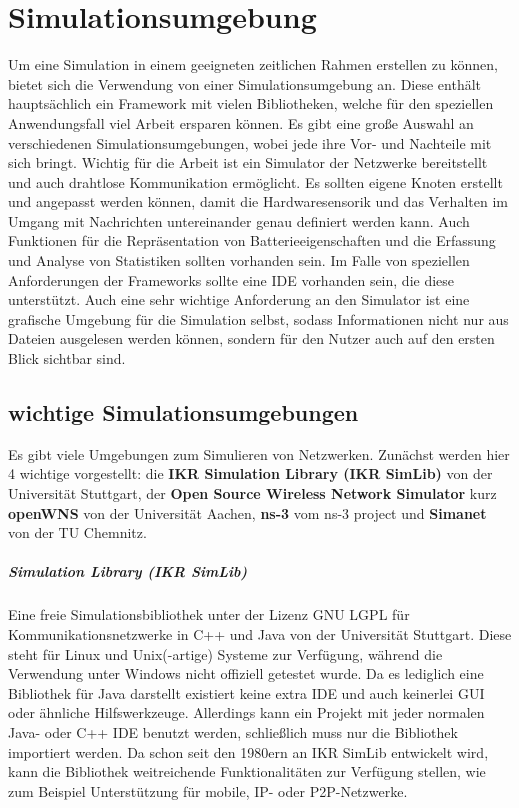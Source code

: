 \chapter{Simulationsumgebung}

Um eine Simulation in einem geeigneten zeitlichen Rahmen erstellen zu können, bietet sich die Verwendung von einer Simulationsumgebung an. Diese enthält hauptsächlich ein Framework mit vielen Bibliotheken, welche für den speziellen Anwendungsfall viel Arbeit ersparen können. \newline
Es gibt eine große Auswahl an verschiedenen Simulationsumgebungen, wobei jede ihre Vor- und Nachteile mit sich bringt. Wichtig für die Arbeit ist ein Simulator der Netzwerke bereitstellt und auch drahtlose Kommunikation ermöglicht. Es sollten eigene Knoten erstellt und angepasst werden können, damit die Hardwaresensorik und das Verhalten im Umgang mit Nachrichten untereinander genau definiert werden kann. Auch Funktionen für die Repräsentation von Batterieeigenschaften und die Erfassung und Analyse von Statistiken sollten vorhanden sein.\newline
Im Falle von speziellen Anforderungen der Frameworks sollte eine IDE vorhanden sein, die diese unterstützt. Auch eine sehr wichtige Anforderung an den Simulator ist eine grafische Umgebung für die Simulation selbst, sodass Informationen nicht nur aus Dateien ausgelesen werden können, sondern für den Nutzer auch auf den ersten Blick sichtbar sind.

\section{wichtige Simulationsumgebungen}

Es gibt viele Umgebungen zum Simulieren von Netzwerken. Zunächst werden hier 4 wichtige vorgestellt: die \textbf{IKR Simulation Library (IKR SimLib)} von der Universität Stuttgart, der \textbf{Open Source Wireless Network Simulator} kurz \textbf{openWNS} von der Universität Aachen, \textbf{ns-3} vom ns-3 project und \textbf{Simanet} von der TU Chemnitz.

\paragraph{Simulation Library (IKR SimLib)\cite{ikr}}

Eine freie Simulationsbibliothek unter der Lizenz GNU LGPL für Kommunikationsnetzwerke in C++ und Java von der Universität Stuttgart. Diese steht für Linux und Unix(-artige) Systeme zur Verfügung, während die Verwendung unter Windows nicht offiziell getestet wurde.\newline
Da es lediglich eine Bibliothek für Java darstellt existiert keine extra IDE und auch keinerlei GUI oder ähnliche Hilfswerkzeuge. Allerdings kann ein Projekt mit jeder normalen Java- oder C++ IDE benutzt werden, schließlich muss nur die Bibliothek importiert werden.\newline
Da schon seit den 1980ern an IKR SimLib entwickelt wird, kann die Bibliothek weitreichende Funktionalitäten zur Verfügung stellen, wie zum Beispiel Unterstützung für mobile, IP- oder P2P-Netzwerke.


